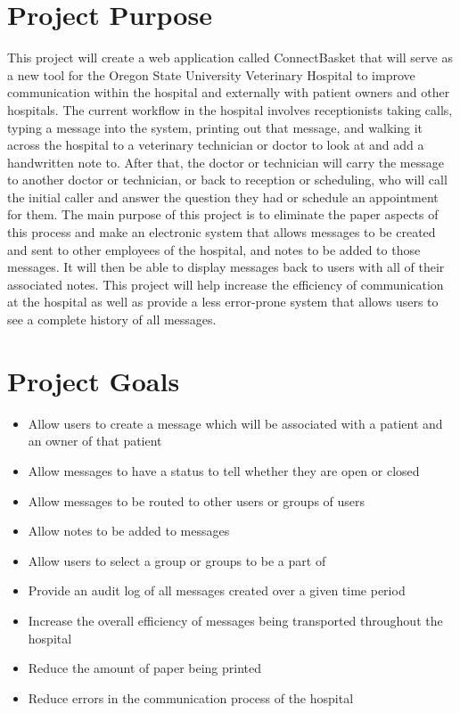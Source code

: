 \documentclass[onecolumn, draftclsnofoot,10pt, compsoc]{IEEEtran}
\begin{document}
\section{Project Purpose}
This project will create a web application called ConnectBasket that will serve as a new tool for the Oregon State University Veterinary Hospital to improve communication within the hospital and externally with patient owners and other hospitals. The current workflow in the hospital involves receptionists taking calls, typing a message into the system, printing out that message, and walking it across the hospital to a veterinary technician or doctor to look at and add a handwritten note to. After that, the doctor or technician will carry the message to another doctor or technician, or back to reception or scheduling, who will call the initial caller and answer the question they had or schedule an appointment for them. The main purpose of this project is to eliminate the paper aspects of this process and make an electronic system that allows messages to be created and sent to other employees of the hospital, and notes to be added to those messages. It will then be able to display messages back to users with all of their associated notes. This project will help increase the efficiency of communication at the hospital as well as provide a less error-prone system that allows users to see a complete history of all messages.

\section{Project Goals}
\begin{itemize}
\item Allow users to create a message which will be associated with a patient and an owner of that patient
\item Allow messages to have a status to tell whether they are open or closed
\item Allow messages to be routed to other users or groups of users
\item Allow notes to be added to messages
\item Allow users to select a group or groups to be a part of
\item Provide an audit log of all messages created over a given time period
\item Increase the overall efficiency of messages being transported throughout the hospital 
\item Reduce the amount of paper being printed
\item Reduce errors in the communication process of the hospital 
\end{itemize}
\end{document}
